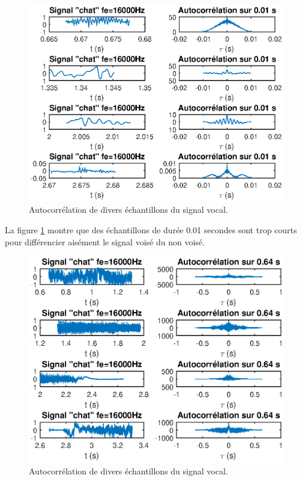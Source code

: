 \documentclass[french]{article}
\begin{document}
\begin{figure}[h!]
\centering
\includegraphics[height=0.45\textheight]{images/classificationVoix1.eps}
\caption{Autocorrélation de divers échantillons du signal vocal.}
\label{classif1}
\end{figure}

La figure \ref{classif1} montre que des échantillons de durée 0.01 secondes sont trop courts pour différencier aisément le signal voisé du non voisé.

\begin{figure}[h!]
\centering
\includegraphics[height=0.45\textheight]{images/classificationVoix4.eps}
\caption{Autocorrélation de divers échantillons du signal vocal.}
\label{classif4}
\end{figure}
\end{document}

